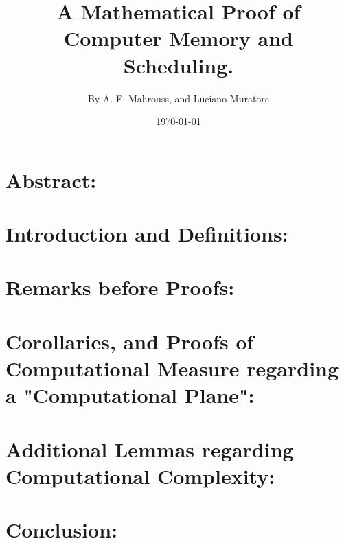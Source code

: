 \documentclass[10pt]{article}
\title{%
	\vspace{-1.5em}%
	\large\textbf{A Mathematical Proof of Computer Memory and Scheduling.}%
}
\author{By A. E. Mahrouss, and Luciano Muratore}
\date{\today}
\theoremstyle{plain}
\theoremstyle{definition}
\theoremstyle{remark}
\begin{document}
	
	\maketitle
	\tableofcontents
	\newpage

\section{Abstract:}
	
\section{Introduction and Definitions:}

\section{Remarks before Proofs:}

\section{Corollaries, and Proofs of Computational Measure regarding a "Computational Plane":}

\section{Additional Lemmas regarding Computational Complexity:}

\section{Conclusion:}

\nocite{*}


\end{document}
